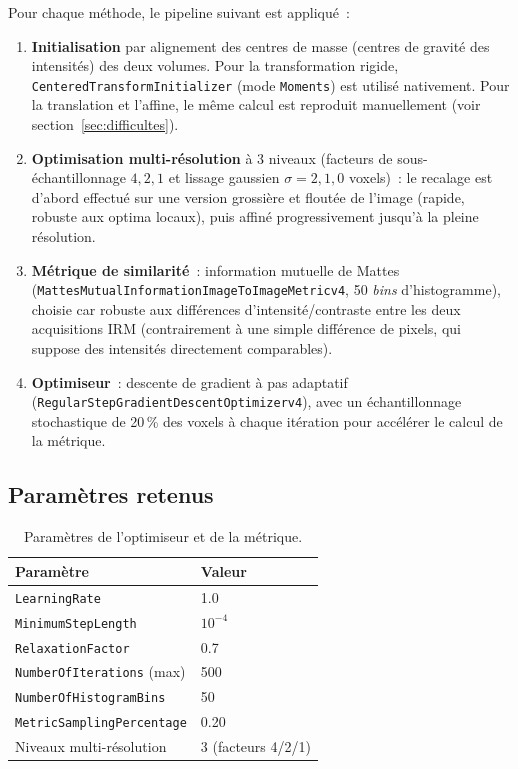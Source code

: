 \documentclass[11pt,a4paper]{article}
\begin{document}
Pour chaque méthode, le pipeline suivant est appliqué~:

\begin{enumerate}
    \item \textbf{Initialisation} par alignement des centres de masse
    (centres de gravité des intensités) des deux volumes. Pour la
    transformation rigide, \texttt{CenteredTransformInitializer} (mode
    \texttt{Moments}) est utilisé nativement. Pour la translation et
    l'affine, le même calcul est reproduit manuellement (voir
    section~\ref{sec:difficultes}).
    \item \textbf{Optimisation multi-résolution} à 3 niveaux (facteurs de
    sous-échantillonnage $4, 2, 1$ et lissage gaussien $\sigma = 2, 1, 0$
    voxels)~: le recalage est d'abord effectué sur une version grossière et
    floutée de l'image (rapide, robuste aux optima locaux), puis affiné
    progressivement jusqu'à la pleine résolution.
    \item \textbf{Métrique de similarité}~: information mutuelle de Mattes
    (\texttt{MattesMutualInformationImageToImageMetricv4}, 50 \emph{bins}
    d'histogramme), choisie car robuste aux différences d'intensité/contraste
    entre les deux acquisitions IRM (contrairement à une simple différence de
    pixels, qui suppose des intensités directement comparables).
    \item \textbf{Optimiseur}~: descente de gradient à pas adaptatif
    (\texttt{RegularStepGradientDescentOptimizerv4}), avec un échantillonnage
    stochastique de 20\,\% des voxels à chaque itération pour accélérer le
    calcul de la métrique.
\end{enumerate}

\subsection{Paramètres retenus}

\begin{table}[H]
\centering
\begin{tabular}{@{}ll@{}}
\toprule
\textbf{Paramètre} & \textbf{Valeur} \\
\midrule
\texttt{LearningRate} & 1.0 \\
\texttt{MinimumStepLength} & $10^{-4}$ \\
\texttt{RelaxationFactor} & 0.7 \\
\texttt{NumberOfIterations} (max) & 500 \\
\texttt{NumberOfHistogramBins} & 50 \\
\texttt{MetricSamplingPercentage} & 0.20 \\
Niveaux multi-résolution & 3 (facteurs 4/2/1) \\
\bottomrule
\end{tabular}
\caption{Paramètres de l'optimiseur et de la métrique.}
\end{table}
\end{document}
